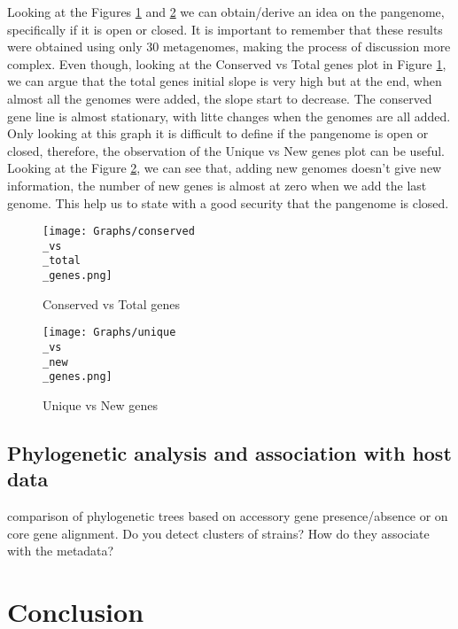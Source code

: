 \documentclass[a4paper,titlepage]{book}
\begin{document}
Looking at the Figures \ref{fig:pangenome3} and  \ref{fig:pangenome4} we can obtain/derive an idea on the pangenome, specifically if it is open or closed. It is important to remember that these results were obtained using only 30 metagenomes, making the process of discussion more complex. Even though, looking at the Conserved vs Total genes plot in Figure \ref{fig:pangenome3}, we can argue that the total genes initial slope is very high but at the end, when almost all the genomes were added, the slope start to decrease. The conserved gene line is almost stationary, with litte changes when the genomes are all added. Only looking at this graph it is difficult to define if the pangenome is open or closed, therefore, the observation of the Unique vs New genes plot can be useful. Looking at the Figure \ref{fig:pangenome4}, we can see that, adding new genomes doesn't give new information, the number of new genes is almost at zero when we add the last genome. This help us to state with a good security that the pangenome is closed.


\begin{figure}[ht]
\centering
\texttt{[image: Graphs/conserved\\\_vs\\\_total\\\_genes.png]}
\caption{Conserved vs Total genes}
\label{fig:pangenome3}
\end{figure}

\begin{figure}[ht]
\centering
\texttt{[image: Graphs/unique\\\_vs\\\_new\\\_genes.png]}
\caption{Unique vs New genes}
\label{fig:pangenome4}
\end{figure}

\section{Phylogenetic analysis and association with host data}
comparison of phylogenetic trees based on accessory gene presence/absence or on core gene alignment. Do you detect clusters of strains? How do they associate with the metadata?

\chapter{Conclusion}
\end{document}
